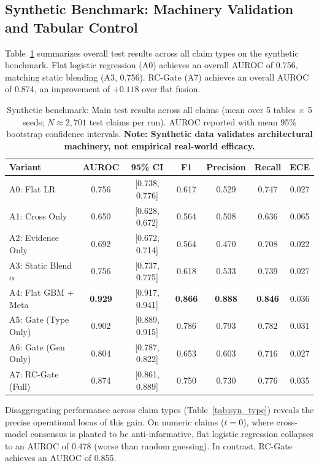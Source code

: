 \documentclass[pdflatex,sn-mathphys,Numbered]{sn-jnl}
\begin{document}
\subsection{Synthetic Benchmark: Machinery Validation and Tabular Control}\label{subsec:results_synthetic}

Table~\ref{tab:syn_main} summarizes overall test results across all claim types on the synthetic benchmark. Flat logistic regression (A0) achieves an overall AUROC of 0.756, matching static blending (A3, 0.756). RC-Gate (A7) achieves an overall AUROC of 0.874, an improvement of $+0.118$ over flat fusion.

\begin{table}[htbp]
\caption{Synthetic benchmark: Main test results across all claims (mean over 5 tables $\times$ 5 seeds; $N \approx 2,701$ test claims per run). AUROC reported with mean 95\% bootstrap confidence intervals. \textbf{Note: Synthetic data validates architectural machinery, not empirical real-world efficacy.}}\label{tab:syn_main}
\footnotesize
\setlength{\tabcolsep}{3.5pt}
\begin{tabular}{@{}lcccccc@{}}
\toprule
\textbf{Variant} & \textbf{AUROC} & \textbf{95\% CI} & \textbf{F1} & \textbf{Precision} & \textbf{Recall} & \textbf{ECE} \\
\midrule
A0: Flat LR & 0.756 & [0.738, 0.776] & 0.617 & 0.529 & 0.747 & 0.027 \\
A1: Cross Only & 0.650 & [0.628, 0.672] & 0.564 & 0.508 & 0.636 & 0.065 \\
A2: Evidence Only & 0.692 & [0.672, 0.714] & 0.564 & 0.470 & 0.708 & 0.022 \\
A3: Static Blend $\alpha$ & 0.756 & [0.737, 0.775] & 0.618 & 0.533 & 0.739 & 0.027 \\
A4: Flat GBM + Meta & \textbf{0.929} & [0.917, 0.941] & \textbf{0.866} & \textbf{0.888} & \textbf{0.846} & 0.036 \\
A5: Gate (Type Only) & 0.902 & [0.889, 0.915] & 0.786 & 0.793 & 0.782 & 0.031 \\
A6: Gate (Gen Only) & 0.804 & [0.787, 0.822] & 0.653 & 0.603 & 0.716 & 0.027 \\
A7: RC-Gate (Full) & 0.874 & [0.861, 0.889] & 0.750 & 0.730 & 0.776 & 0.035 \\
\bottomrule
\end{tabular}
\end{table}

Disaggregating performance across claim types (Table~\ref{tab:syn_type}) reveals the precise operational locus of this gain. On numeric claims ($t=0$), where cross-model consensus is planted to be anti-informative, flat logistic regression collapses to an AUROC of 0.478 (worse than random guessing). In contrast, RC-Gate achieves an AUROC of 0.855.
\end{document}

